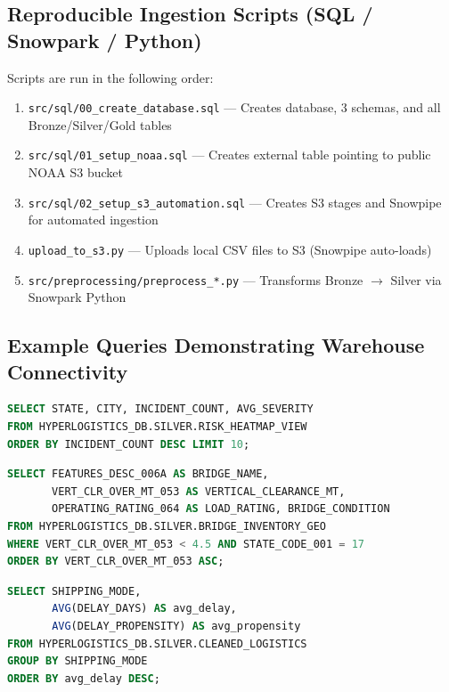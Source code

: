 \documentclass[14.5pt,letterpaper]{article}
\begin{document}
\subsection{Reproducible Ingestion Scripts (SQL / Snowpark / Python)}

Scripts are run in the following order:

\begin{enumerate}
    \item \texttt{src/sql/00\_create\_database.sql} --- Creates database, 3 schemas, and all Bronze/Silver/Gold tables
    \item \texttt{src/sql/01\_setup\_noaa.sql} --- Creates external table pointing to public NOAA S3 bucket
    \item \texttt{src/sql/02\_setup\_s3\_automation.sql} --- Creates S3 stages and Snowpipe for automated ingestion
    \item \texttt{upload\_to\_s3.py} --- Uploads local CSV files to S3 (Snowpipe auto-loads)
    \item \texttt{src/preprocessing/preprocess\_*.py} --- Transforms Bronze $\rightarrow$ Silver via Snowpark Python
\end{enumerate}

\subsection{Example Queries Demonstrating Warehouse Connectivity}

\begin{lstlisting}[language=SQL, caption={Query 1: Top accident hotspots along freight corridors}]
SELECT STATE, CITY, INCIDENT_COUNT, AVG_SEVERITY
FROM HYPERLOGISTICS_DB.SILVER.RISK_HEATMAP_VIEW
ORDER BY INCIDENT_COUNT DESC LIMIT 10;
\end{lstlisting}

\begin{lstlisting}[language=SQL, caption={Query 2: Bridge clearance check for Illinois routes}]
SELECT FEATURES_DESC_006A AS BRIDGE_NAME,
       VERT_CLR_OVER_MT_053 AS VERTICAL_CLEARANCE_MT,
       OPERATING_RATING_064 AS LOAD_RATING, BRIDGE_CONDITION
FROM HYPERLOGISTICS_DB.SILVER.BRIDGE_INVENTORY_GEO
WHERE VERT_CLR_OVER_MT_053 < 4.5 AND STATE_CODE_001 = 17
ORDER BY VERT_CLR_OVER_MT_053 ASC;
\end{lstlisting}

\begin{lstlisting}[language=SQL, caption={Query 3: Delay analysis by shipping mode (Silver layer)}]
SELECT SHIPPING_MODE,
       AVG(DELAY_DAYS) AS avg_delay,
       AVG(DELAY_PROPENSITY) AS avg_propensity
FROM HYPERLOGISTICS_DB.SILVER.CLEANED_LOGISTICS
GROUP BY SHIPPING_MODE
ORDER BY avg_delay DESC;
\end{lstlisting}
\end{document}
